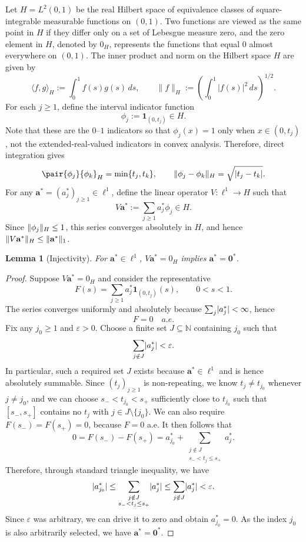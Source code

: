 \documentclass[11pt,a4paper]{article}
\theoremstyle{reportstyle}
\newtheorem{lemma}{Lemma}
\numberwithin{equation}{section}
\newcommand{\NN}{\mathbb N}
\newcommand{\ba}{\mathbf a}
\newcommand{\bzero}{\mathbf 0}
\newcommand{\ind}{\mathbf 1}
\DeclarePairedDelimiter{\norm}{\lVert}{\rVert}
\DeclarePairedDelimiter{\abs}{\lvert}{\rvert}
\begin{document}
	Let $H=L^2(0,1)$ be the real Hilbert space of equivalence classes of square-integrable measurable functions on $(0,1)$. Two functions are viewed as the same point in $H$ if they differ only on a set of Lebesgue measure zero, and the zero element in $H$, denoted by $0_H$, represents the functions that equal  $0$ almost everywhere on $(0,1)$. The inner product and norm on the Hilbert space $H$ are given by
	$$ \langle f,g\rangle_H := \int_0^1 f(s)g(s)\,ds,
	\qquad \|f\|_H := \left( \int_0^1 |f(s)|^2\,ds \right)^{1/2}.$$
	For each $j\ge 1$, define the interval indicator function
	$$ \phi_j := \mathbf{1}_{(0,t_j)} \in H. $$
	Note that these are the $0$--$1$ indicators so that $\phi_j(x)=1$ only when $x\in(0,t_j)$, not the extended-real-valued indicators in convex analysis. Therefore, direct integration gives
	\begin{equation}
		\pair{\phi_j}{\phi_k}_H=\min\{t_j,t_k\},
		\qquad
		\norm{\phi_j-\phi_k}_H=\sqrt{\abs{t_j-t_k}}.
		\label{eq:interval-identities}
	\end{equation}
	For any $\ba^*=(a_j^*)_{j\ge1}\in\ell^1$, define the linear operator $V:\ell^1\to H$ such that
	\begin{equation}
		V\ba^*:=\sum_{j\ge1}a_j^*\phi_j\in H.
		\label{eq:V-definition}
	\end{equation}
	Since $\norm{\phi_j}_H\le1$, this series converges absolutely in $H$,
	and hence $\norm{V\ba^*}_H\le\norm{\ba^*}_1$. \vspace{0.3cm}

	\begin{lemma}[Injectivity]
		\label{lem:V-injective}
		For $\ba^*\in\ell^1$, $V\ba^*=0_H$ implies
		$\ba^*=\bzero^*$.
	\end{lemma}
	\begin{proof}
		Suppose $V\ba^*=0_H$ and consider the representative
		$$ F(s)=\sum_{j\ge1}a_j^*\ind_{(0,t_j)}(s),\qquad 0<s<1. $$
		The series converges uniformly and absolutely because
		$\sum_j\abs{a_j^*}<\infty$, hence
		$$F=0\quad a.e.$$
		Fix any $j_0\ge1$ and $\varepsilon>0$. Choose a finite set
		$J\subseteq\NN$ containing $j_0$ such that
		$$ \sum_{j\notin J}\abs{a_j^*}<\varepsilon. $$
		In particular, such a required set $J$ exists because $\ba^*\in\ell^1$ and is hence absolutely summable. Since $(t_j)_{j\geq1}$ is non-repeating, we know $t_j\neq t_{j_0}$ whenever $j\neq j_0$, and we can choose
		$s_-<t_{j_0}<s_+$ sufficiently close to $t_{j_0}$ such that $[s_-,s_+]$ contains no $t_j$ with $j\in J\setminus\{j_0\}$.
		We can also require $F(s_-)=F(s_+)=0$, because $F=0$ a.e. It then follows that
		$$ 0=F(s_-)-F(s_+) =a_{j_0}^*+ \sum_{\substack{j\notin J\\s_-<t_j\le s_+}}a_j^*. $$
		Therefore, through standard triangle inequality, we have
		$$ \abs{a_{j_0}^*} \le\sum_{\substack{j\notin J\\s_-<t_j\le s_+}}\abs{a_j^*} \le\sum_{j\notin J}\abs{a_j^*}<\varepsilon. $$
		Since $\varepsilon$ was arbitrary, we can drive it to zero and obtain $a_{j_0}^*=0$. As the index $j_0$ is also arbitrarily selected, we have $\ba^*=\bzero^*$.
	\end{proof}
\end{document}
